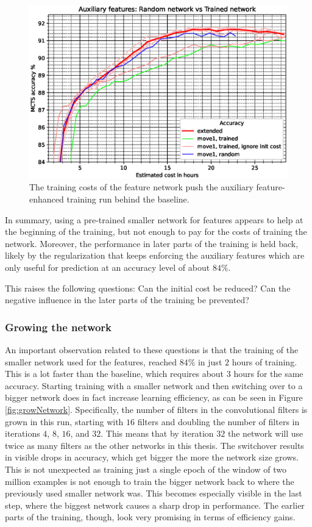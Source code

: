 \documentclass[12pt,onecolumn,oneside,titlepage]{article}
\begin{document}
\begin{figure}[H]
\centering
\includegraphics[clip,width=\columnwidth]{rndVsTrainedAux}
\caption{The training costs of the feature network push the auxiliary feature-enhanced training run behind the baseline.}
\label{fig:rndVsTrainedAux}
\end{figure}

In summary, using a pre-trained smaller network for features appears to help at the beginning of the training, but not enough to pay for the costs of training the network. 
Moreover, the performance in later parts of the training is held back, likely by the
regularization that keeps enforcing the auxiliary features which are only useful for prediction at an accuracy level of about $84\%$.

This raises the following questions: Can the initial cost be reduced? Can the negative influence in the later parts of the training be prevented?

\subsubsection{Growing the network}

An important observation related to these questions is that the training of the smaller network used for the features, reached $84\%$ in just $2$ hours of training.
This is a lot faster than the baseline, which requires about $3$ hours for the same accuracy.
Starting training with a smaller network and then switching over to a bigger network does in fact increase learning efficiency, as can be seen in Figure \ref{fig:growNetwork}.
Specifically, the number of filters in the convolutional filters is grown in this run,
starting with $16$ filters and doubling the number of filters in iterations $4$, $8$, $16$, and $32$.
This means that by iteration $32$ the network will use twice as many filters as the other networks in this thesis. 
The switchover results in visible
drops in accuracy, which get bigger the more the network size grows. This is not unexpected as training just a single epoch of the window of two million examples is not enough to train the bigger network back to where the previously used smaller network was.
This becomes especially visible in the last step, where the biggest network causes a sharp drop in performance.
The earlier parts of the training, though, look very promising in terms of efficiency gains.
\end{document}
